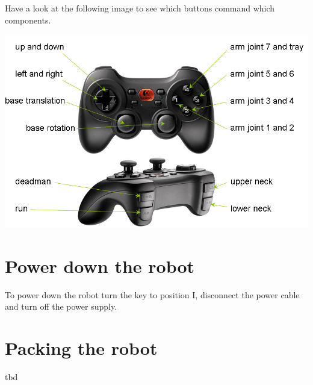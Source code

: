 Have a look at the following image to see which buttons command which components. 
\begin{center}
\includegraphics[width=1\textwidth]{images/joystick.png}
\end{center}

\section{Power down the robot}
To power down the robot turn the key to position I, disconnect the power cable and turn off the power supply.

\section{Packing the robot}
tbd